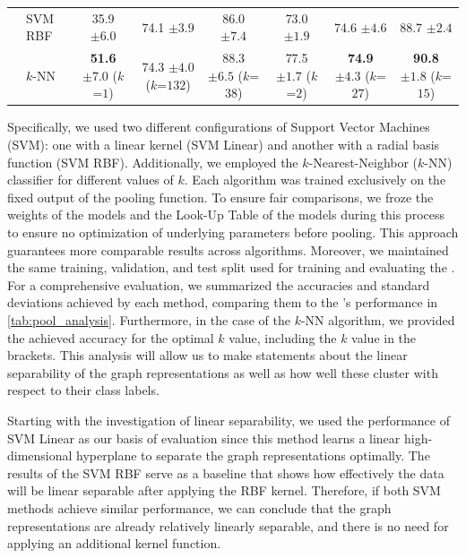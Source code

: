 \begin{table}[!htb]
{\begin{tabular}{@{}c <{\enspace}@{}lcccccc@{}}
			\\
			& \textsf{SVM RBF} & 35.9 \scriptsize $\pm 6.0$ & 74.1 \scriptsize $\pm 3.9$ & 86.0 \scriptsize $\pm 7.4$ & 73.0 \scriptsize $\pm 1.9$ & 74.6 \scriptsize $\pm 4.6$ & 88.7 \scriptsize $\pm 2.4$
			\\ 
			& \textsf{$k$-NN} & \textbf{51.6} \scriptsize $\pm 7.0$ ($k$=$1$)	& 74.3 \scriptsize $\pm 4.0$ ($k$=$132$) & 88.3 \scriptsize $\pm 6.5$ ($k$=$38$) & 77.5 \scriptsize $\pm 1.7$ ($k$=$2$)& \textbf{74.9} \scriptsize $\pm 4.3$ ($k$=$27$) & \textbf{90.8} \scriptsize $\pm 1.8$ ($k$=$15$)
			\\
			\bottomrule
		\end{tabular}}                
\end{table}

Specifically, we used two different configurations of \textsf{Support Vector Machines (SVM)}: one with a linear kernel (\textsf{SVM Linear}) and another with a radial basis function (\textsf{SVM RBF}). Additionally, we employed the \textsf{$k$-Nearest-Neighbor ($k$-NN)} classifier for different values of $k$. Each algorithm was trained exclusively on the fixed output of the pooling function. To ensure fair comparisons, we froze the weights of the \gnn models and the Look-Up Table of the \wlnn models during this process to ensure no optimization of underlying parameters before pooling. This approach guarantees more comparable results across algorithms. Moreover, we maintained the same training, validation, and test split used for training and evaluating the \mlp. For a comprehensive evaluation, we summarized the accuracies and standard deviations achieved by each method, comparing them to the \mlp's performance in \cref{tab:pool_analysis}. Furthermore, in the case of the \textsf{$k$-NN} algorithm, we provided the achieved accuracy for the optimal $k$ value, including the $k$ value in the brackets. This analysis will allow us to make statements about the linear separability of the graph representations as well as how well these cluster with respect to their class labels.

Starting with the investigation of linear separability, we used the performance of \textsf{SVM Linear} as our basis of evaluation since this method learns a linear high-dimensional hyperplane to separate the graph representations optimally. The results of the \textsf{SVM RBF} serve as a baseline that shows how effectively the data will be linear separable after applying the \textsf{RBF} kernel. Therefore, if both \textsf{SVM} methods achieve similar performance, we can conclude that the graph representations are already relatively linearly separable, and there is no need for applying an additional kernel function.

